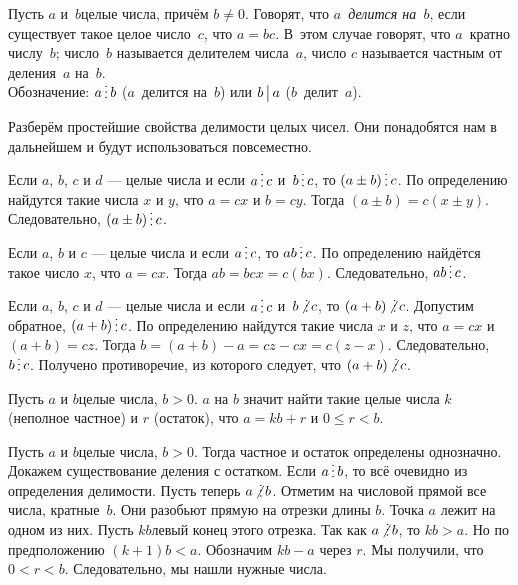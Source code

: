 \documentclass[a4paper,12pt]{article}
\newcommand{\ndv}{\smash{\mskip3mu\not\lower1truept\hbox{\vdots}\mskip3mu}}
\begin{document}


Пусть $a$ и~$b$\т целые числа, причём $b\ne 0$. Говорят, что \emph{$a$~делится на~$b$}, если существует такое целое число~$c$, что $a=bc$. В~этом случае говорят, что $a$~ кратно числу~$b$; число~$b$ называется  делителем числа~$a$, число $c$ называется  частным от деления~$a$ на~$b$. \\
Обозначение: $a \dv b$ ($a$~делится на~$b$) или $b \,\bigl\rvert\, a$ ($b$~делит~$a$).

\bigskip
Разберём простейшие свойства делимости целых чисел. Они понадобятся нам в дальнейшем и будут использоваться повсеместно.
\bigskip

\label{apb}
Если $a$, $b$, $c$ и $d$ --- целые числа и если $a \dv c$ и~$b \dv c$, то $(a\pm b)\dv c$.
По определению найдутся такие числа $x$ и $y$, что $a=cx$ и $b=cy$.
Тогда $(a\pm b)= c (x\pm y)$. Следовательно,  $(a\pm b)\dv c$.


\label{amb}
Если $a$, $b$ и $c$ --- целые числа и если  $a \dv c$, то $ab \dv c$.
По определению найдётся такое число $x$, что $a=cx$.
Тогда $ab=bcx=c(bx)$. Следовательно,  $ab \dv c$.

\label{anb}
Если $a$, $b$, $c$ и $d$ --- целые числа и если $a \dv c$ и~$b \ndv c$, то $(a+b)\ndv c$.
Допустим обратное, $(a+b)\dv c$. По определению найдутся такие числа $x$ и $z$, что $a=cx$ и $(a+b)=cz$.
Тогда $b = (a+b)-a = cz-cx=c(z-x)$. Следовательно,  $b\dv c$.
Получено противоречие, из которого следует, что  $(a+b)\ndv c$.





Пусть $a$ и $b$\т целые числа, $b > 0$.  $a$ на $b$  значит найти такие целые числа $k$ (неполное частное) и $r$ (остаток), что $a = kb + r$ и $0\le r < b$.

\label{ost}
Пусть $a$ и $b$\т целые числа, $b > 0$. Тогда частное и остаток определены однозначно.
Докажем существование деления с остатком.
Если $a\dv b$, то всё очевидно из определения делимости. Пусть теперь $a\ndv b$.
Отметим на числовой прямой все числа, кратные~$b$. Они разобьют прямую на отрезки длины $b$. Точка $a$ лежит на одном из них. Пусть $kb$\т левый конец этого отрезка.
Так как $a\ndv b$, то $kb>a$. Но по предположению $(k+1)b < a$. Обозначим $kb-a$ через $r$.
Мы получили, что $0<r<b$. Следовательно, мы нашли нужные числа.
\end{document}
